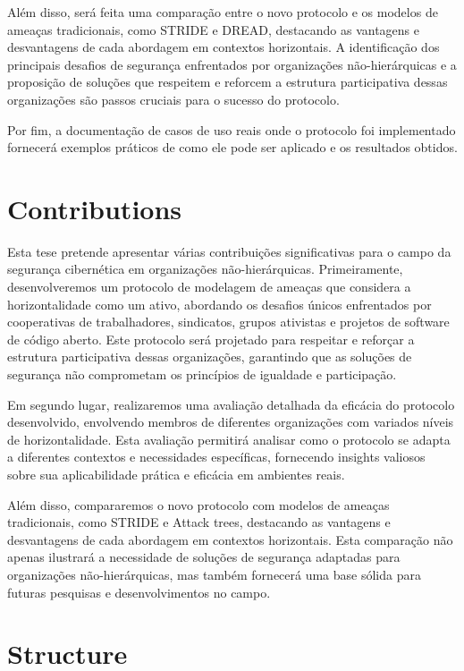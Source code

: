 Além disso, será feita uma comparação entre o novo protocolo e os modelos de
ameaças tradicionais, como STRIDE e DREAD, destacando as vantagens e desvantagens de
cada abordagem em contextos horizontais. A identificação dos principais desafios de
segurança enfrentados por organizações não-hierárquicas e a proposição de soluções
que respeitem e reforcem a estrutura participativa dessas organizações são passos
cruciais para o sucesso do protocolo.

Por fim, a documentação de casos de uso reais onde o protocolo foi
implementado fornecerá exemplos práticos de como ele pode ser aplicado e os resultados
obtidos.


\section{Contributions}
\label{sec:contributions}

Esta tese pretende apresentar várias contribuições significativas para o campo
da segurança cibernética em organizações não-hierárquicas. Primeiramente,
desenvolveremos um protocolo de modelagem de ameaças que considera a horizontalidade como um
ativo, abordando os desafios únicos enfrentados por cooperativas de trabalhadores,
sindicatos, grupos ativistas e projetos de software de código aberto. Este protocolo será
projetado para respeitar e reforçar a estrutura participativa dessas organizações,
garantindo que as soluções de segurança não comprometam os princípios de igualdade e
participação. 

Em segundo lugar, realizaremos uma avaliação detalhada da eficácia do
protocolo desenvolvido, envolvendo membros de diferentes organizações com variados
níveis de horizontalidade. Esta avaliação permitirá analisar como o protocolo se
adapta a diferentes contextos e necessidades específicas, fornecendo insights
valiosos sobre sua aplicabilidade prática e eficácia em ambientes reais.  

Além disso, compararemos o novo protocolo com modelos de ameaças tradicionais,
como STRIDE e Attack trees, destacando as vantagens e desvantagens de cada abordagem em
contextos horizontais. Esta comparação não apenas ilustrará a necessidade de soluções de
segurança adaptadas para organizações não-hierárquicas, mas também fornecerá uma base
sólida para futuras pesquisas e desenvolvimentos no campo.

\section{Structure}
\label{sec:structure}

